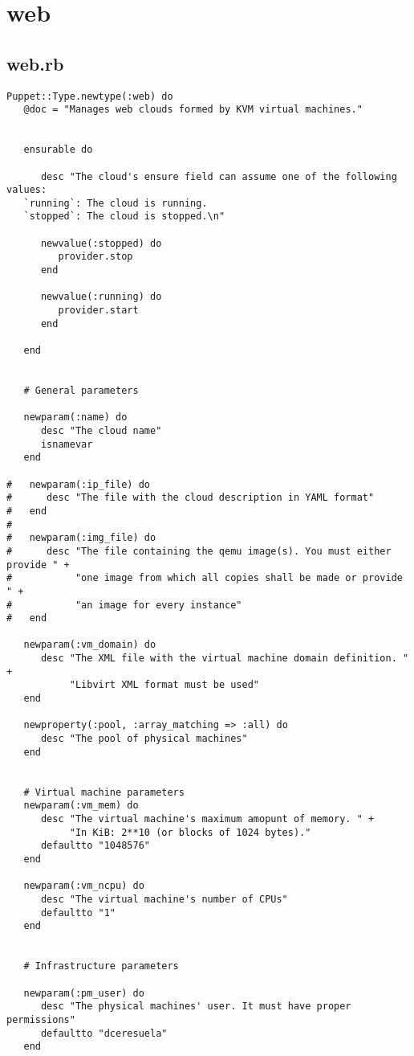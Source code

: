 \section{web}
\subsection{web.rb}


\begin{lstlisting}
Puppet::Type.newtype(:web) do
   @doc = "Manages web clouds formed by KVM virtual machines."
   
   
   ensurable do

      desc "The cloud's ensure field can assume one of the following values:
   `running`: The cloud is running.
   `stopped`: The cloud is stopped.\n"
   
      newvalue(:stopped) do
         provider.stop
      end

      newvalue(:running) do
         provider.start
      end

   end


   # General parameters
   
   newparam(:name) do
      desc "The cloud name"
      isnamevar
   end
   
#   newparam(:ip_file) do
#      desc "The file with the cloud description in YAML format"
#   end
#   
#   newparam(:img_file) do
#      desc "The file containing the qemu image(s). You must either provide " +
#           "one image from which all copies shall be made or provide " +
#           "an image for every instance"
#   end
   
   newparam(:vm_domain) do
      desc "The XML file with the virtual machine domain definition. " +
           "Libvirt XML format must be used"
   end
   
   newproperty(:pool, :array_matching => :all) do
      desc "The pool of physical machines"
   end

   
   # Virtual machine parameters
   newparam(:vm_mem) do
      desc "The virtual machine's maximum amopunt of memory. " + 
           "In KiB: 2**10 (or blocks of 1024 bytes)."
      defaultto "1048576"
   end
   
   newparam(:vm_ncpu) do
      desc "The virtual machine's number of CPUs"
      defaultto "1"
   end
   
   
   # Infrastructure parameters

   newparam(:pm_user) do
      desc "The physical machines' user. It must have proper permissions"
      defaultto "dceresuela"
   end


\end{lstlisting}
